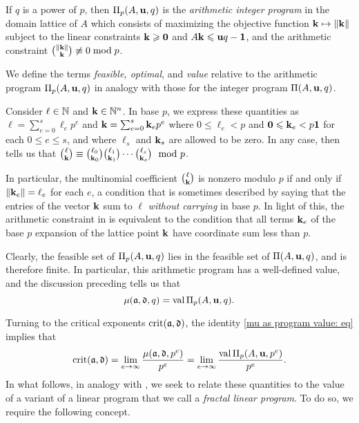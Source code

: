 \documentclass{amsart}
\begin{document}
\begin{definition}
\label{aip: D}
If $q$ is a power of $p$, then $\Pi_p(A, \mathbf{u}, q)$ is the \emph{arithmetic integer program} in the domain lattice of $A$ which consists of maximizing the objective function $\mathbf{k} \mapsto \| \mathbf{k} \|$ subject to the linear constraints $\mathbf{k} \geqslant \mathbf{0}$ and $A \mathbf{k} \leqslant \mathbf{u}q - \mathbf{1}$, and the arithmetic constraint $\binom{\| \mathbf{k} \|}{\mathbf{k}} \not \equiv 0 \bmod p$.
\end{definition}

We define the terms \emph{feasible, optimal}, and \emph{value} relative to the arithmetic program $\Pi_p(A, \mathbf{u}, q)$ in analogy with those for the integer program $\Pi(A, \mathbf{u}, q)$.

\begin{remark}
   \label{dickson: R}
   Consider $\ell \in \mathbb{N}$ and $\mathbf{k} \in \mathbb{N}^n$.
   In base $p$, we express these quantities as $\ell = \sum_{e=0}^s \ell_e p^e$ and $\mathbf{k}=\sum_{e=0}^s \mathbf{k}_e p^e$ where $0\le \ell_e < p$ and $\mathbf{0}\leqslant\mathbf{k}_e < p  \mathbf{1}$ for each $0 \leq e \leq s$, and where $\ell_s$ and $\mathbf{k}_s$ are allowed to be zero.
   In any case, \cite{dickson.multinomial} then tells us that $\binom{\ell}{\mathbf{k}}\equiv \binom{\ell_0}{\mathbf{k}_0}\binom{\ell_1}{\mathbf{k}_1}\cdots \binom{\ell_s}{\mathbf{k}_s} \mod{p}$.

   In particular, the multinomial coefficient $\binom{\ell}{\mathbf{k}}$ is nonzero modulo $p$ if and only if $\| \mathbf{k}_e \|=\ell_e$ for each $e$, a condition that is sometimes described by saying that the entries of the vector $\mathbf{k}$ sum to $\ell$ \emph{without carrying} in base $p$.
   In light of this, the arithmetic constraint in  is equivalent to the condition that all terms $\mathbf{k}_e$ of the base $p$ expansion of the lattice point $\mathbf{k}$ have coordinate sum less than $p$.
\end{remark}

Clearly, the feasible set of $\Pi_p(A, \mathbf{u}, q)$ lies in the feasible set of $\Pi(A, \mathbf{u},q)$, and is therefore finite.
In particular, this arithmetic program has a well-defined value, and the discussion preceding  tells us that
\begin{equation}
\label{mu as program value: eq}
\mu(\mathfrak{a},\mathfrak{d},q) = \operatorname{val} \Pi_p(A,\mathbf{u},q).
\end{equation}

Turning to the critical exponents $\operatorname{crit}(\mathfrak{a}, \mathfrak{d})$, the identity \eqref{mu as program value: eq} implies that
\begin{equation}
\label{crit as limit of normalized program values: eq}
\operatorname{crit}(\mathfrak{a},\mathfrak{d}) = \lim_{e\to\infty} \frac{\mu(\mathfrak{a},\mathfrak{d},p^e)}{p^e} = \lim_{e\to\infty} \frac{\operatorname{val} \Pi_p(A,\mathbf{u},p^e)}{p^e}.
\end{equation}
In what follows, in analogy with , we seek to relate these quantities to the value of a variant of a linear program that we call a \emph{fractal linear program}.  To do so, we require the following concept.
\end{document}
